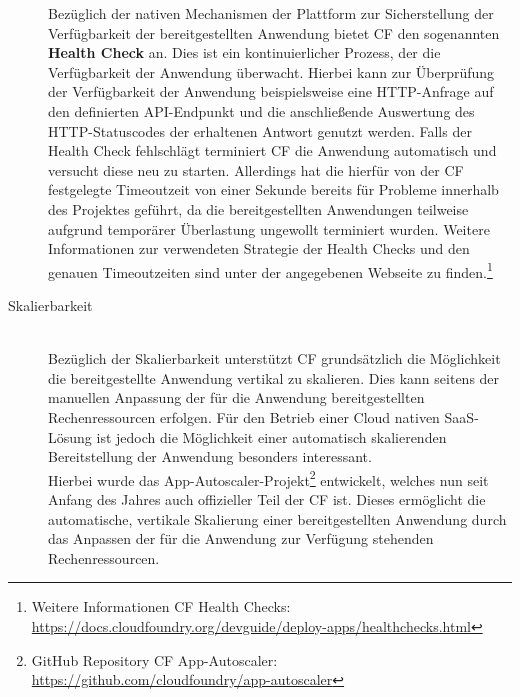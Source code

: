 \begin{description}
	Bezüglich der nativen Mechanismen der Plattform zur Sicherstellung der Verfügbarkeit der bereitgestellten Anwendung bietet \ac{CF} den sogenannten \textbf{Health Check} an. Dies ist ein kontinuierlicher Prozess, der die Verfügbarkeit der Anwendung überwacht. Hierbei kann zur Überprüfung der Verfügbarkeit der Anwendung beispielsweise eine \ac{HTTP}-Anfrage auf den definierten \ac{API}-Endpunkt und die anschließende Auswertung des \ac{HTTP}-Statuscodes der erhaltenen Antwort genutzt werden. 
	\newpage
	Falls der Health Check fehlschlägt terminiert \ac{CF} die Anwendung automatisch und versucht diese neu zu starten. Allerdings hat die hierfür von der \ac{CF} festgelegte Timeoutzeit von einer Sekunde bereits für Probleme innerhalb des Projektes geführt, da die bereitgestellten Anwendungen teilweise aufgrund temporärer Überlastung ungewollt terminiert wurden. Weitere Informationen zur verwendeten Strategie der Health Checks und den genauen Timeoutzeiten sind unter der angegebenen Webseite zu finden.\footnote{Weitere Informationen \ac{CF} Health Checks: \url{https://docs.cloudfoundry.org/devguide/deploy-apps/healthchecks.html}}
	\\
	\item[Skalierbarkeit] \hfill \\
	Bezüglich der Skalierbarkeit unterstützt \ac{CF} grundsätzlich die Möglichkeit die bereitgestellte Anwendung vertikal zu skalieren. Dies kann seitens der manuellen Anpassung der für die Anwendung bereitgestellten Rechenressourcen erfolgen.
	Für den Betrieb einer Cloud nativen \ac{SaaS}-Lösung ist jedoch die Möglichkeit einer automatisch skalierenden Bereitstellung der Anwendung besonders interessant. \\
	Hierbei wurde das App-Autoscaler-Projekt\footnote{GitHub Repository \ac{CF} App-Autoscaler: \url{https://github.com/cloudfoundry/app-autoscaler}} entwickelt, welches nun seit Anfang des Jahres auch offizieller Teil der \ac{CF} ist. Dieses ermöglicht die automatische, vertikale Skalierung einer bereitgestellten Anwendung durch das Anpassen der für die Anwendung zur Verfügung stehenden Rechenressourcen.\autocite[Vgl.][]{Yang.2019}

\end{description}
